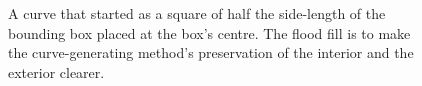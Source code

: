 \documentclass[12pt]{article}
\begin{document}
\begin{figure}[h!]
 \begin{center} 
  \parbox{110mm}{\caption{\label{loop} A curve that started as a square of half the
  side-length of the bounding box placed at the box's centre.  The
  flood fill is to make the curve-generating method's preservation of
  the interior and the exterior clearer.}}
\end{center}
\end{figure}
\end{document}

